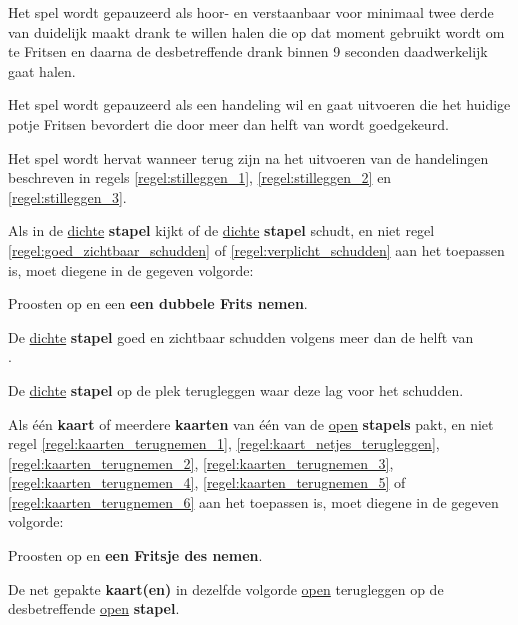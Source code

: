 \vervolgLijst{}
\item Het spel wordt gepauzeerd als \eenSpeler hoor- en verstaanbaar voor minimaal twee derde van \alleSpelers duidelijk maakt drank te willen halen die op dat moment gebruikt wordt om te Fritsen en daarna de desbetreffende drank binnen 9 seconden daadwerkelijk gaat halen.
\label{regel:stilleggen_2}
\eindLijst{}

\vervolgLijst{}
\item Het spel wordt gepauzeerd als \eenSpeler een handeling wil en gaat uitvoeren die het huidige potje Fritsen bevordert die door meer dan helft van \alleSpelers wordt goedgekeurd.
\label{regel:stilleggen_3}
\eindLijst{}

\vervolgLijst{}
\item Het spel wordt hervat wanneer \alleSpelers terug zijn na het uitvoeren van de handelingen beschreven in regels \ref{regel:stilleggen_1}, \ref{regel:stilleggen_2} en \ref{regel:stilleggen_3}.
\label{regel:stilleggen_4}
\eindLijst{}


\vervolgLijst{}
\item Als \eenSpeler in de \ul{dichte} \textbf{stapel} kijkt of de \ul{dichte} \textbf{stapel} schudt, en niet regel \ref{regel:goed_zichtbaar_schudden} of \ref{regel:verplicht_schudden} aan het toepassen is, moet diegene in de gegeven volgorde:
\puntLijst{}
\item Proosten op  en een \textbf{een dubbele Frits nemen}\footnotemark[2].
\item De \ul{dichte} \textbf{stapel} goed en zichtbaar schudden volgens meer dan de helft van \\ \alleSpelersN.
\item De \ul{dichte} \textbf{stapel} op de plek terugleggen waar deze lag voor het schudden.
\eindPuntLijst{}
\label{regel:kijken_in_dichte_stapel}
\eindLijst{}

\vervolgLijst{}
\item Als \eenSpeler één \textbf{kaart} of meerdere \textbf{kaarten} van één van de \ul{open} \textbf{stapels} pakt, en niet regel \ref{regel:kaarten_terugnemen_1}, \ref{regel:kaart_netjes_terugleggen}, \ref{regel:kaarten_terugnemen_2}, \ref{regel:kaarten_terugnemen_3}, \ref{regel:kaarten_terugnemen_4}, \ref{regel:kaarten_terugnemen_5} of \ref{regel:kaarten_terugnemen_6} aan het toepassen is, moet diegene in de gegeven volgorde:
\puntLijst{}
\item Proosten op  en \textbf{een Fritsje des nemen}\footnotemark[3].
\item De net gepakte \textbf{kaart(en)} in dezelfde volgorde \ul{open} terugleggen op de desbetreffende \ul{open} \textbf{stapel}.
\eindPuntLijst{}
\eindLijst{}

